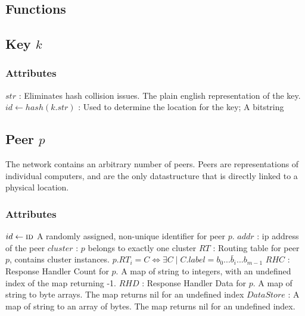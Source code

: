 \documentclass[]{article}
\begin{document}
			\subsection{Functions}
				\begin{algorithmic}
				
					
						\State {}
					\EndFunction
						
				\end{algorithmic}

			\subsection{Key $k$}
				\subsubsection{Attributes}
					\begin{algorithmic}
						\State $str$ : Eliminates hash collision issues. The plain english representation of the key.
						\State $id \gets hash(k.str)$ : Used to determine the location for the key; A bitstring
					\end{algorithmic}

			\subsection{Peer $p$}
				The network contains an arbitrary number of peers. 
				Peers are representations of individual computers, and are the only datastructure that is directly linked to a physical location.
				\subsubsection{Attributes}
					\begin{algorithmic}
						\State $id \gets \Call{id}{} $ A randomly assigned, non-unique identifier for peer $p$.
						\State $addr$ : ip address of the peer
						\State $cluster$ : $p$ belongs to exactly one cluster 
						\State $RT$ : Routing table for peer $p$, contains cluster instances.  $p.RT_i = C \iff \exists C  \mid  C.label = b_0...\bar{b}_i...b_{m-1}$
						\State $RHC$ : Response Handler Count for $p$. A map of string to integers, with an undefined index of the map returning -1. 
						\State $RHD$ : Response Handler Data for $p$. A map of string to byte arrays. The map returns nil for an undefined index
						\State $DataStore$ : A map of string to an array of bytes. The map returns nil for an undefined index.
					\end{algorithmic}
\end{document}
